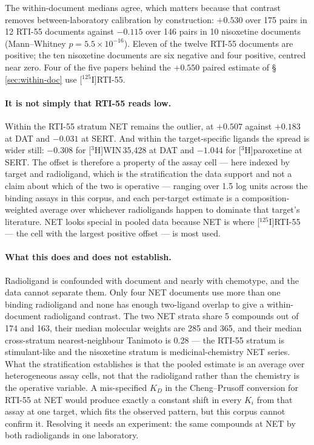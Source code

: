 \documentclass[11pt,a4paper]{article}
\begin{document}
The within-document medians agree, which matters because that contrast removes
between-laboratory calibration by construction: $+0.530$ over 175 pairs in 12 RTI-55
documents against $-0.115$ over 146 pairs in 10 nisoxetine documents (Mann--Whitney
$p=5.5\times10^{-16}$). Eleven of the twelve RTI-55 documents are positive; the ten
nisoxetine documents are six negative and four positive, centred near zero. Four of the
five papers behind the $+0.550$ paired estimate of \S\,\ref{sec:within-doc} use
[$^{125}$I]RTI-55.

\paragraph{It is not simply that RTI-55 reads low.} Within the RTI-55 stratum NET remains
the outlier, at $+0.507$ against $+0.183$ at DAT and $-0.031$ at SERT. And within the
target-specific ligands the spread is wider still: $-0.308$ for [$^{3}$H]WIN\,35,428 at
DAT and $-1.044$ for [$^{3}$H]paroxetine at SERT. The offset is therefore a property of
the assay cell --- here indexed by target and radioligand, which is the stratification the
data support and not a claim about which of the two is operative --- ranging over 1.5 log
units across the binding assays in this corpus, and each per-target estimate is a composition-weighted average over whichever
radioligands happen to dominate that target's literature. NET looks special in pooled data
because NET is where [$^{125}$I]RTI-55 --- the cell with the largest positive offset --- is
most used.

\paragraph{What this does and does not establish.} Radioligand is confounded with document
and nearly with chemotype, and the data cannot separate them. Only four NET documents use
more than one binding radioligand and none has enough two-ligand overlap to give a
within-document radioligand contrast. The two NET strata share 5 compounds out of 174 and
163, their median molecular weights are 285 and 365, and their median cross-stratum
nearest-neighbour Tanimoto is 0.28 --- the RTI-55 stratum is stimulant-like and the
nisoxetine stratum is medicinal-chemistry NET series. What the stratification establishes
is that the pooled estimate is an average over heterogeneous assay cells, not that the
radioligand rather than the chemistry is the operative variable. A mis-specified $K_D$ in
the Cheng--Prusoff conversion for RTI-55 at NET would produce exactly a constant shift in
every $K_i$ from that assay at one target, which fits the observed pattern, but this
corpus cannot confirm it. Resolving it needs an experiment: the same compounds at NET by
both radioligands in one laboratory.
\end{document}
